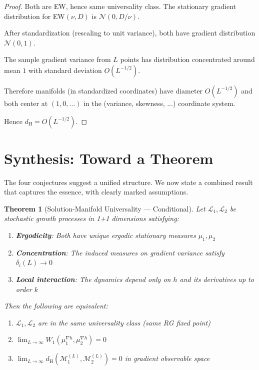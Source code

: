 \documentclass[11pt]{article}
\newtheorem{theorem}{Theorem}[section]
\newcommand{\calM}{\mathcal{M}}
\newcommand{\dH}{d_{\mathrm{H}}}
\begin{document}
\begin{proof}
Both are EW, hence same universality class. The stationary gradient distribution for EW$(\nu, D)$ is $\mathcal{N}(0, D/\nu)$.

After standardization (rescaling to unit variance), both have gradient distribution $\mathcal{N}(0, 1)$.

The sample gradient variance from $L$ points has distribution concentrated around mean $1$ with standard deviation $O(L^{-1/2})$.

Therefore manifolds (in standardized coordinates) have diameter $O(L^{-1/2})$ and both center at $(1, 0, \ldots)$ in the (variance, skewness, ...) coordinate system.

Hence $\dH = O(L^{-1/2})$.
\end{proof}

\section{Synthesis: Toward a Theorem}

The four conjectures suggest a unified structure. We now state a combined result that captures the essence, with clearly marked assumptions.

\begin{theorem}[Solution-Manifold Universality --- Conditional]
\label{thm:main}
Let $\mathcal{L}_1, \mathcal{L}_2$ be stochastic growth processes in 1+1 dimensions satisfying:
\begin{enumerate}
\item[(A1)] \textbf{Ergodicity}: Both have unique ergodic stationary measures $\mu_1, \mu_2$
\item[(A2)] \textbf{Concentration}: The induced measures on gradient variance satisfy $\delta_i(L) \to 0$
\item[(A3)] \textbf{Local interaction}: The dynamics depend only on $h$ and its derivatives up to order $k$
\end{enumerate}

Then the following are equivalent:
\begin{enumerate}
\item[(i)] $\mathcal{L}_1, \mathcal{L}_2$ are in the same universality class (same RG fixed point)
\item[(ii)] $\lim_{L \to \infty} W_1(\mu_1^{\nabla h}, \mu_2^{\nabla h}) = 0$
\item[(iii)] $\lim_{L \to \infty} \dH(\calM_1^{(L)}, \calM_2^{(L)}) = 0$ in gradient observable space
\end{enumerate}
\end{theorem}
\end{document}

